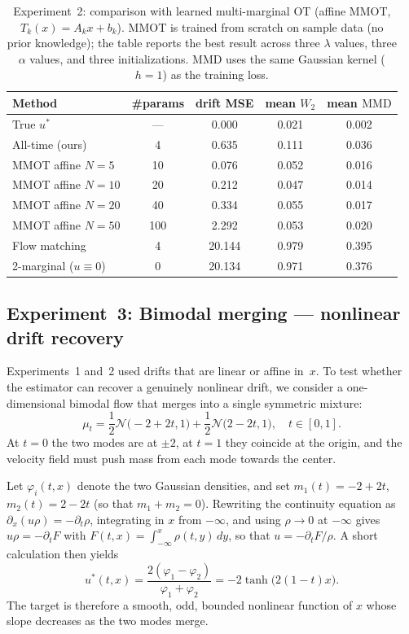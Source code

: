 \documentclass[11pt,leqno]{article}
\theoremstyle{plain}
\theoremstyle{remark}
\theoremstyle{definition}
\numberwithin{equation}{section}
\numberwithin{figure}{section}
\numberwithin{table}{section}
\begin{document}
\begin{table}[htbp]
\centering
\caption{Experiment~2: comparison with learned multi-marginal OT
(affine MMOT, $T_k(x)=A_kx+b_k$).
MMOT is trained from scratch on sample data (no prior knowledge);
the table reports the best result across three $\lambda$ values,
three $\alpha$ values, and three initializations.  MMD uses the same
Gaussian kernel ($h=1$) as the training loss.}
\label{tab:exp2-mmot}
\begin{tabular}{lcccc}
\toprule
Method & \#params & drift MSE & mean $W_2$ & mean $\mathrm{MMD}$ \\
\midrule
True $u^*$        & ---  & 0.000  & 0.021 & 0.002 \\
All-time (ours)   & 4    & 0.635  & 0.111 & 0.036 \\
MMOT affine $N{=}5$  & 10   & 0.076  & 0.052 & 0.016 \\
MMOT affine $N{=}10$ & 20   & 0.212  & 0.047 & 0.014 \\
MMOT affine $N{=}20$ & 40   & 0.334  & 0.055 & 0.017 \\
MMOT affine $N{=}50$ & 100  & 2.292  & 0.053 & 0.020 \\
Flow matching     & 4    & 20.144 & 0.979 & 0.395 \\
2-marginal ($u{\equiv}0$) & 0 & 20.134 & 0.971 & 0.376 \\
\bottomrule
\end{tabular}
\end{table}



\subsection{Experiment~3: Bimodal merging --- nonlinear drift recovery}
\label{sec:exp-bimodal}

Experiments~1 and~2 used drifts that are linear or affine in~$x$.  To
test whether the estimator can recover a genuinely nonlinear drift, we
consider a one-dimensional bimodal flow that merges into a single
symmetric mixture:
\begin{equation}
  \mu_t = \frac{1}{2} \mathcal{N}\bigl(-2+2t, 1\bigr)
        + \frac{1}{2} \mathcal{N}\bigl( 2-2t, 1\bigr), \quad t\in[0,1].
\end{equation}
At $t=0$ the two modes are at $\pm2$, at $t=1$ they coincide at the
origin, and the velocity field must push mass from each mode towards
the center.

Let $\varphi_i(t,x)$ denote the two Gaussian densities, and set
$m_1(t)=-2+2t$, $m_2(t)=2-2t$ (so that $m_1+m_2=0$).  Rewriting
the continuity equation as $\partial_x(u\rho)=-\partial_t\rho$,
integrating in $x$ from $-\infty$, and using $\rho\to 0$ at $-\infty$
gives $u\rho=-\partial_t F$ with $F(t,x)=\int_{-\infty}^{x}\rho(t,y)\,dy$,
so that $u=-\partial_t F/\rho$.  A short calculation then yields
\begin{equation}
  u^*(t,x)
   = \frac{2(\varphi_1-\varphi_2)}{\varphi_1+\varphi_2}
   = 
  -2 \tanh \bigl(2(1-t) x\bigr).
  \label{eq:exp4-true}
\end{equation}
The target is therefore a smooth, odd, bounded nonlinear function of
$x$ whose slope decreases as the two modes merge.
\end{document}
